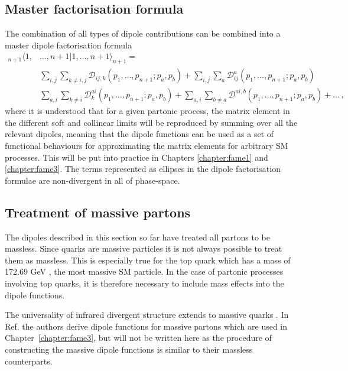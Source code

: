 \documentclass[main.tex]{subfiles}
\begin{document}
    \subsection{Master factorisation formula}
        The combination of all types of dipole contributions
        can be combined into a master dipole factorisation formula
        \begin{equation}\label{eqn:dipole_factorisation_master}
            \begin{split}
            {}_{n+1} \langle 1, &\ldots, n+1 | 1, \ldots, n+1 \rangle_{n+1} = \\
            &\sum_{i,j}\sum_{k \neq i, j} \mathcal{D}_{ij,k}(p_{1},\ldots,p_{n+1};p_{a},p_{b}) + \sum_{i,j}\sum_{a} \mathcal{D}_{ij}^{a}(p_{1},\ldots,p_{n+1};p_{a},p_{b}) \\
            &\sum_{a,i}\sum_{k \neq i} \mathcal{D}_{k}^{ai}(p_{1},\ldots,p_{n+1};p_{a},p_{b}) + \sum_{a,i}\sum_{b \neq a} \mathcal{D}^{ai,b}(p_{1},\ldots,p_{n+1};p_{a},p_{b}) + \ldots \, ,
            \end{split}
        \end{equation}
        where it is understood that for a given partonic process,
        the matrix element in the different soft and collinear limits will be
        reproduced by summing over all the relevant dipoles, meaning that
        the dipole functions can be used as a set of functional behaviours for
        approximating the matrix elements for arbitrary SM processes.
        This will be put into practice in Chapters \ref{chapter:fame1}
        and \ref{chapter:fame3}. The terms represented as ellipses in
        the dipole factorisation formulae are non-divergent
        in all of phase-space.

    \subsection{Treatment of massive partons}
        The dipoles described in this section so far have
        treated all partons to be massless. Since quarks are massive
        particles it is not always possible to treat them
        as massless. This is especially true for the top
        quark which has a mass of 172.69 GeV \cite{Workman:2022ynf}, the
        most massive SM particle. In the case of partonic
        processes involving top quarks, it is therefore
        necessary to include mass effects into the dipole
        functions.

        The universality of infrared divergent structure
        extends to massive quarks \cite{Catani:2000ef}.
        In Ref. \cite{Catani:2002hc} the authors derive dipole
        functions for massive partons which
        are used in Chapter~\ref{chapter:fame3}, but will
        not be written here as the procedure of constructing
        the massive dipole functions is similar to their massless counterparts.
\end{document}

